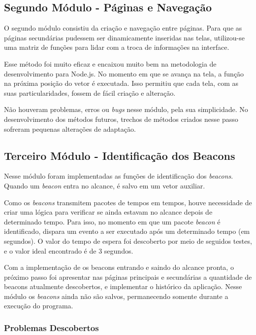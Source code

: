 \subsection{Segundo Módulo - Páginas e Navegação}\label{sec:segundo-modulo}

O segundo módulo consistiu da criação e navegação entre páginas. Para que as páginas secundárias pudessem ser dinamicamente inseridas nas telas, utilizou-se uma matriz de funções para lidar com a troca de informações na interface. 

Esse método foi muito eficaz e encaixou muito bem na metodologia de desenvolvimento para Node.js. No momento em que se avança na tela, a função na próxima posição do vetor é executada. Isso permitiu que cada tela, com as suas particularidades, fossem de fácil criação e alteração.

Não houveram problemas, erros ou \textit{bugs} nesse módulo, pela sua simplicidade. No desenvolvimento dos métodos futuros, trechos de métodos criados nesse passo sofreram pequenas alterações de adaptação.

\subsection{Terceiro Módulo - Identificação dos Beacons}\label{sec:terceiro-modulo}

Nesse módulo foram implementadas as funções de identificação dos \textit{beacons}. Quando um \textit{beacon} entra no alcance, é salvo em um vetor auxiliar. 

Como os \textit{beacons} transmitem pacotes de tempos em tempos, houve necessidade de criar uma lógica para verificar se ainda estavam no alcance depois de determinado tempo. Para isso, no momento em que um pacote \textit{beacon} é identificado, dispara um evento a ser executado após um determinado tempo (em segundos). O valor do tempo de espera foi descoberto por meio de seguidos testes, e o valor ideal encontrado é de 3 segundos.

Com a implementação de os beacons entrando e saindo do alcance pronta, o próximo passo foi apresentar nas páginas principais e secundárias a quantidade de beacons atualmente descobertos, e implementar o histórico da aplicação. Nesse módulo os \textit{beacons} ainda não são salvos, permanecendo somente durante a execução do programa.

\subsubsection{Problemas Descobertos}\label{sec:problema-quarto-modulo}

